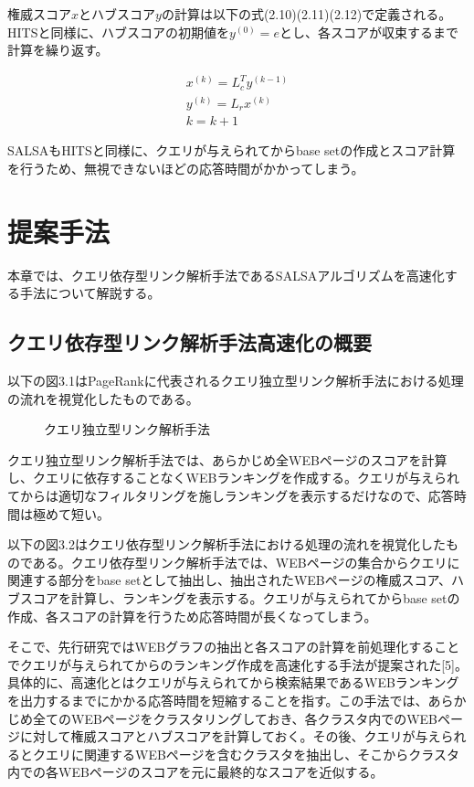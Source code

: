 \documentclass[a4paper,11pt]{jreport}
\begin{document}
権威スコア$x$とハブスコア$y$の計算は以下の式(2.10)(2.11)(2.12)で定義される。
HITSと同様に、ハブスコアの初期値を$y^{(0)} = e$とし、各スコアが収束するまで計算を繰り返す。

\begin{eqnarray}
x^{(k)} = L_c^Ty^{(k-1)} \\
y^{(k)} = L_rx^{(k)} \\
k = k + 1
\end{eqnarray}

SALSAもHITSと同様に、クエリが与えられてからbase setの作成とスコア計算を行うため、無視できないほどの応答時間がかかってしまう。

\chapter{提案手法}

本章では、クエリ依存型リンク解析手法であるSALSAアルゴリズムを高速化する手法について解説する。

\section{クエリ依存型リンク解析手法高速化の概要}

以下の図3.1はPageRankに代表されるクエリ独立型リンク解析手法における処理の流れを視覚化したものである。

\begin{figure}[htbp]
\begin{center}
\end{center}
\caption{クエリ独立型リンク解析手法}
\label{figure:sample}
\end{figure}

クエリ独立型リンク解析手法では、あらかじめ全WEBページのスコアを計算し、クエリに依存することなくWEBランキングを作成する。クエリが与えられてからは適切なフィルタリングを施しランキングを表示するだけなので、応答時間は極めて短い。

以下の図3.2はクエリ依存型リンク解析手法における処理の流れを視覚化したものである。クエリ依存型リンク解析手法では、WEBページの集合からクエリに関連する部分をbase setとして抽出し、抽出されたWEBページの権威スコア、ハブスコアを計算し、ランキングを表示する。クエリが与えられてからbase setの作成、各スコアの計算を行うため応答時間が長くなってしまう。

そこで、先行研究ではWEBグラフの抽出と各スコアの計算を前処理化することでクエリが与えられてからのランキング作成を高速化する手法が提案された[5]。具体的に、高速化とはクエリが与えられてから検索結果であるWEBランキングを出力するまでにかかる応答時間を短縮することを指す。この手法では、あらかじめ全てのWEBページをクラスタリングしておき、各クラスタ内でのWEBページに対して権威スコアとハブスコアを計算しておく。その後、クエリが与えられるとクエリに関連するWEBページを含むクラスタを抽出し、そこからクラスタ内での各WEBページのスコアを元に最終的なスコアを近似する。
\end{document}
